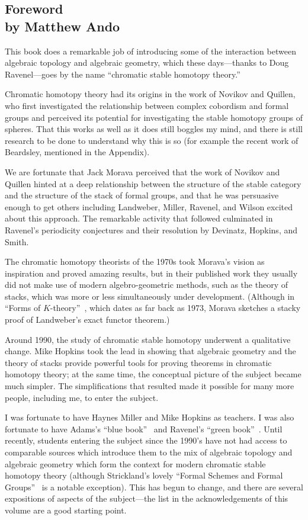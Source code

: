 
\subsection*{Foreword \\ by Matthew Ando}

This book does a remarkable job of introducing some of the 
interaction between algebraic topology and algebraic geometry, which
these days---thanks to Doug Ravenel---goes by the name ``chromatic
stable homotopy theory.''

Chromatic homotopy theory had its origins in the work of Novikov and
Quillen, who first investigated the relationship between complex
cobordism and formal groups and perceived its potential for
investigating the stable homotopy groups of spheres. That this works
as well as it does still boggles my mind, and there is still research
to be done to understand why this is so (for example the recent work
of Beardsley, mentioned in the Appendix).  

We are fortunate that Jack Morava perceived that the work of Novikov
and Quillen hinted at a deep relationship between the structure of
the stable category and the structure of the stack of formal groups,
and that he was persuasive enough to get others including Landweber,
Miller, Ravenel, and Wilson excited about this approach. The
remarkable activity that followed culminated in  Ravenel's periodicity
conjectures and their resolution by Devinatz, Hopkins, and Smith. 

The chromatic homotopy theorists of the 1970s took Morava's
vision as inspiration and proved amazing results, but in their
published work they usually did not make use of modern
algebro-geometric methods, such as the theory of stacks, which was
more or less simultaneously under development.  (Although in
``Forms of $K$-theory''~\cite{MoravaFormsOfKthy}, which dates as far back as 1973, Morava sketches
a stacky proof of Landweber's exact functor theorem.)

Around 1990, the study of chromatic stable homotopy underwent a
qualitative change. Mike Hopkins took the lead in
showing that algebraic geometry and the theory of stacks
provide powerful tools for proving theorems in chromatic homotopy
theory; at the same time, the conceptual picture of the subject became
much simpler.  The simplifications that resulted made it possible for
many more people, including me, to enter the subject. 

I was fortunate to have Haynes Miller and Mike Hopkins as
teachers.  I was also fortunate to have Adams's ``blue book''~\cite{AdamsBlueBook} and
Ravenel's ``green book''~\cite{RavenelGreenBook}. Until recently, students entering the
subject since the 1990's have not had access to comparable sources
which introduce them to the mix of algebraic topology and algebraic
geometry which form the context for  
modern chromatic stable homotopy theory (although Strickland's 
lovely 
``Formal Schemes and Formal Groups''~\cite{StricklandFSFG} is a notable exception).  This has
begun to change, and there are several expositions of aspects of the
subject---the list in the acknowledgements of this volume are a good
starting point.  

